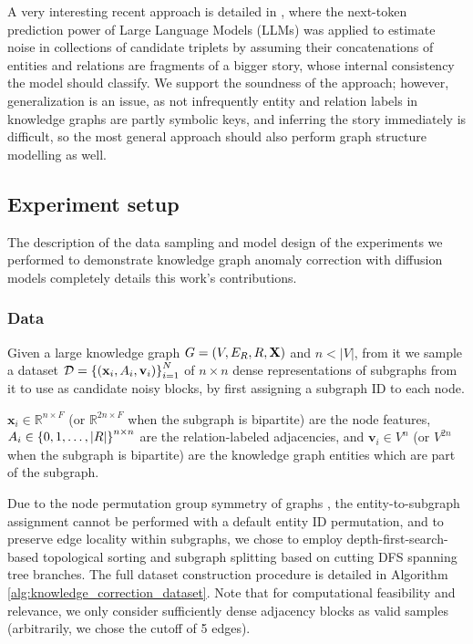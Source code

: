 A very interesting recent approach is detailed in \cite{dong_refining_2025}, where the next-token prediction power of Large Language Models (LLMs) was applied to estimate noise in collections of candidate triplets by assuming their concatenations of entities and relations are fragments of a bigger story, whose internal consistency the model should classify. We support the soundness of the approach; however, generalization is an issue, as not infrequently entity and relation labels in knowledge graphs are partly symbolic keys, and inferring the story immediately is difficult, so the most general approach should also perform graph structure modelling as well.

\subsection{Experiment setup}

The description of the data sampling and model design of the experiments we performed to demonstrate knowledge graph anomaly correction with diffusion models completely details this work's contributions.

\subsubsection{Data}

Given a large knowledge graph $G=\mathopen{}\left(V, E_R, R, \mathbf{X}\right)$ and $n<|V|$, from it we sample a dataset $\mathcal{D}=\mathopen{}\left\{\mathopen{}\left(\mathbf{x}_i,A_i,\mathbf{v}_i\right)\right\}_{i=1}^{N}$ of $n \times n$ dense representations of subgraphs from it to use as candidate noisy blocks, by first assigning a subgraph ID to each node. 

$\mathbf{x}_i \in \mathbb{R}^{n \times F}$ (or $\mathbb{R}^{2n \times F}$ when the subgraph is bipartite) are the node features, $A_i \in \mathopen{}\left\{0,1,\dots,|R|\right\}^{n \times n}$ are the relation-labeled adjacencies, and $\mathbf{v}_i \in V^{n}$ (or $V^{2n}$ when the subgraph is bipartite) are the knowledge graph entities which are part of the subgraph.

Due to the node permutation group symmetry of graphs \cite{bronstein_geometric_2021}, the entity-to-subgraph assignment cannot be performed with a default entity ID permutation, and to preserve edge locality within subgraphs, we chose to employ depth-first-search-based topological sorting and subgraph splitting based on cutting DFS spanning tree branches. The full dataset construction procedure is detailed in Algorithm \ref{alg:knowledge_correction_dataset}. Note that for computational feasibility and relevance, we only consider sufficiently dense adjacency blocks as valid samples (arbitrarily, we chose the cutoff of 5 edges). 

